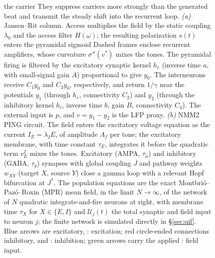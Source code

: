\documentclass[11pt,a4paper]{article}
\providecommand{\DIFaddtex}[1]{{\protect\color{blue} \sf #1}} %
\providecommand{\DIFdeltex}[1]{{\protect\color{red} \scriptsize #1}} %
\providecommand{\DIFaddFL}[1]{\DIFadd{#1}} %
\providecommand{\DIFdelFL}[1]{\DIFdel{#1}} %
\providecommand{\DIFaddbeginFL}{} %
\providecommand{\DIFaddendFL}{} %
\providecommand{\DIFdelbeginFL}{} %
\providecommand{\DIFdelendFL}{} %
\providecommand{\DIFadd}[1]{\texorpdfstring{\DIFaddtex{#1}}{#1}} %
\providecommand{\DIFdel}[1]{\texorpdfstring{\DIFdeltex{#1}}{}} %
\begin{document}
\begin{figure}[t!]
{{the carrier }\DIFdelendFL \DIFaddbeginFL \DIFaddFL{They suppress carriers }\DIFaddendFL more strongly than
the generated beat and transmit the steady shift\DIFdelbeginFL \DIFdelFL{into the recurrent loop}\DIFdelendFL .
\DIFdelbeginFL \DIFdelFL{\emph{(a)} Jansen--Rit column. Access multiplies the field by the static coupling
$\lambda_0$ and the access filter $H(\omega)$; the resulting polarization $s(t)$ enters
the pyramidal sigmoid}\DIFdelendFL \DIFaddbeginFL \DIFaddFL{Dashed frames enclose recurrent amplifiers}\DIFaddendFL , \DIFdelbeginFL \DIFdelFL{whose curvature $\sigma''(v^*)$ mixes the tones. The pyramidal
firing is filtered by the excitatory synaptic kernel $h_e$ (inverse time $a$, }\DIFdelendFL \DIFaddbeginFL \DIFaddFL{with small-signal }\DIFaddendFL gain
\DIFdelbeginFL \DIFdelFL{$A$)
}\DIFdelendFL \DIFaddbeginFL \DIFaddFL{proportional }\DIFaddendFL to \DIFdelbeginFL \DIFdelFL{give $y_0$. The interneurons receive $C_1y_0$ and $C_3y_0$, respectively, and
return }\DIFdelendFL \DIFaddbeginFL \DIFaddFL{$1/\gamma$ near }\DIFaddendFL the \DIFdelbeginFL \DIFdelFL{potentials $y_1$ (through $h_e$, connectivity $C_2$) and $y_2$ (through the
inhibitory kernel $h_i$, inverse time $b$, gain $B$, connectivity $C_4$). The external input is
$p$, and $v=y_1-y_2$ is the LFP proxy.
\emph{(b)} NMM2 PING circuit. The field enters the excitatory voltage equation as the
current $I_E=\lambda_I E$, of amplitude $A_f$ per tone; the excitatory membrane, with time
constant $\tau_E$, integrates it before the quadratic term $v_E^2$ mixes the tones.
Excitatory (AMPA, $\tau_a$) and inhibitory (GABA, $\tau_g$) synapses with global coupling
$J$ and pathway weights $w_{XY}$ (target $X$, source $Y$) close a gamma loop with a }\DIFdelendFL \DIFaddbeginFL \DIFaddFL{relevant }\DIFaddendFL Hopf\DIFdelbeginFL \DIFdelFL{bifurcation at $J^*$}\DIFdelendFL .
\DIFdelbeginFL \DIFdelFL{The population equations are the exact Montbri\'o--Paz\'o--Roxin
(MPR) mean field, in the limit $N\to\infty$, of the network of $N$ quadratic
integrate-and-fire neurons at right, with membrane time $\tau_X$ for $X\in\{E,I\}$
and $\mathcal U_j(t)$ the total
synaptic and field input to neuron $j$; the finite network is simulated directly in
\S\ref{sec:qif}. }\DIFdelendFL Blue\DIFdelbeginFL \DIFdelFL{arrows are excitatory, }\DIFdelendFL \DIFaddbeginFL \DIFaddFL{: excitation; }\DIFaddendFL red\DIFdelbeginFL \DIFdelFL{circle-ended connections inhibitory,
and }\DIFdelendFL \DIFaddbeginFL \DIFaddFL{: inhibition; }\DIFaddendFL green\DIFdelbeginFL \DIFdelFL{arrows carry the applied }\DIFdelendFL \DIFaddbeginFL \DIFaddFL{: }\DIFaddendFL field input.}
\label{fig:models}
\end{figure}
\end{document}
